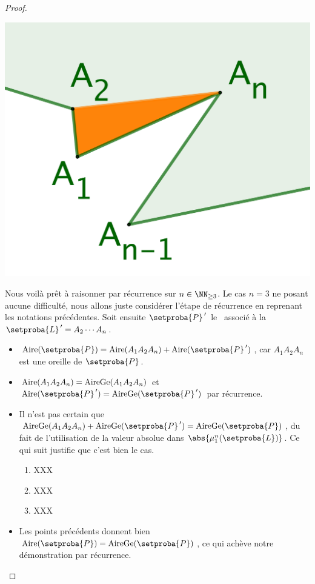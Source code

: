 \begin{proof}
    
    \begin{center}
        \includegraphics[scale=.4]{content/polygon/sufficient-cond/triangulation-proof.png}
    \end{center}
    
    
    Nous voilà prêt à raisonner par récurrence sur $n \in \NN_{\geq3}$.
    Le cas $n = 3$ ne posant aucune difficulté, nous allons juste considérer l'étape de récurrence en reprenant les notations précédentes.
    Soit ensuite
    $\setproba{P}^{\,\prime}$ le \ngone\ associé à la \nline\ $\setproba{L}^{\,\prime} = A_2 \cdots A_n$.
    
    \begin{itemize}
    	\item $\area{\setproba{P}} = \area{A_1 A_2 A_n}  +  \area{\setproba{P}^{\,\prime}}$, 
		car $A_1 A_2 A_n$ est une oreille de $\setproba{P}$.

    	\item $\mathrm{Aire}(A_1 A_2 A_n) = \mathrm{AireGe}(A_1 A_2 A_n)$ et $\area{\setproba{P}^{\,\prime}} = \garea{\setproba{P}^{\,\prime}}$ 
		par récurrence.

    	\item Il n'est pas certain que $\garea{A_1 A_2 A_n} + \garea{\setproba{P}^{\,\prime}} = \garea{\setproba{P}}$,
	du fait de l'utilisation de la valeur absolue dans $\abs{\mu_1^n (\setproba{L})}$.
	Ce qui suit justifie que c'est bien le cas.
		\begin{enumerate}
			\item XXX

			\item XXX

			\item XXX
		\end{enumerate}

    	\item Les points précédents donnent bien $\area{\setproba{P}} = \garea{\setproba{P}}$, ce qui achève notre démonstration par récurrence.
    \end{itemize}
\end{proof}


